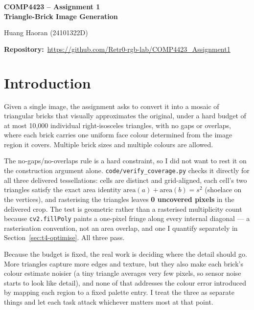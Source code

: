 \documentclass[11pt,a4paper]{article}
\begin{document}
\begin{center}
{\Large\bfseries COMP4423 -- Assignment 1\\
Triangle-Brick Image Generation\par}
\vspace{0.6em}
{\normalsize Huang Haoran (24101322D)\par}
\vspace{0.2em}
{\small\textbf{Repository:}\ \url{https://github.com/Retr0-rgb-lab/COMP4423_Assignment1}\par}
\end{center}

\FloatBarrier
\FloatBarrier
\section{Introduction}

Given a single image, the assignment asks to convert it into a mosaic of
triangular bricks that visually approximates the original, under a hard budget
of at most 10{,}000 individual right-isosceles triangles, with no gaps or
overlaps, where each brick carries one uniform face colour determined from the
image region it covers. Multiple brick sizes and multiple colours are allowed.

The no-gaps/no-overlaps rule is a hard constraint, so I did not want to rest it
on the construction argument alone. \texttt{code/verify\_coverage.py} checks it
directly for all three delivered tessellations: cells are distinct and
grid-aligned, each cell's two triangles satisfy the exact area identity
$\mathrm{area}(a) + \mathrm{area}(b) = s^{2}$ (shoelace on the vertices), and
rasterising the triangles leaves \textbf{0 uncovered pixels} in the delivered
crop. The test is geometric rather than a rasterised multiplicity count because
\texttt{cv2.fillPoly} paints a one-pixel fringe along every internal diagonal ---
a rasterisation convention, not an area overlap, and one I quantify separately in
Section~\ref{sec:t4-optimise}. All three pass.

Because the budget is fixed, the real work is deciding where the detail should
go. More triangles capture more edges and texture, but they also make each
brick's colour estimate noisier (a tiny triangle averages very few pixels, so
sensor noise starts to look like detail), and none of that addresses the colour
error introduced by mapping each region to a fixed palette entry. I treat the
three as separate things and let each task attack whichever matters most at
that point.
\end{document}
